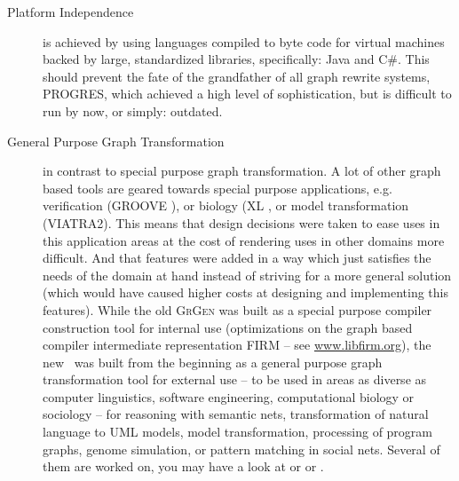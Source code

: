 \begin{description}
\item[Platform Independence]
is achieved by using languages compiled to byte code for virtual machines backed by large, standardized libraries, specifically: Java and C\#.
This should prevent the fate of the grandfather of all graph rewrite systems, PROGRES\cite{schuerr99progres},
which achieved a high level of sophistication, but is difficult to run by now, or simply: outdated.

\item[General Purpose Graph Transformation]
in contrast to special purpose graph transformation.
A lot of other graph based tools are geared towards special purpose applications,
e.g. verification (GROOVE \cite{Groove}), or biology (XL \cite{xl}, or model transformation (VIATRA2\cite{viatra2}).
This means that design decisions were taken to ease uses in this application areas at the cost of rendering uses in other domains more difficult.
And that features were added in a way which just satisfies the needs of the domain at hand instead of striving for a more general solution
(which would have caused higher costs at designing and implementing this features).
While the old \textsc{GrGen} was built as a special purpose compiler construction tool for internal use
(optimizations on the graph based compiler intermediate representation FIRM -- see \url{www.libfirm.org}),
the new \GrG\ was built from the beginning as a general purpose graph transformation tool for external use
-- to be used in areas as diverse as computer linguistics, software engineering, computational biology or sociology --
for reasoning with semantic nets, transformation of natural language to UML models,
model transformation, processing of program graphs, genome simulation, or pattern matching in social nets.
Several of them are worked on, you may have a look at \cite{usecomputerlinguistics} or \cite{usemodeltransformation} or \cite{usegeneexpression}.

\end{description}
